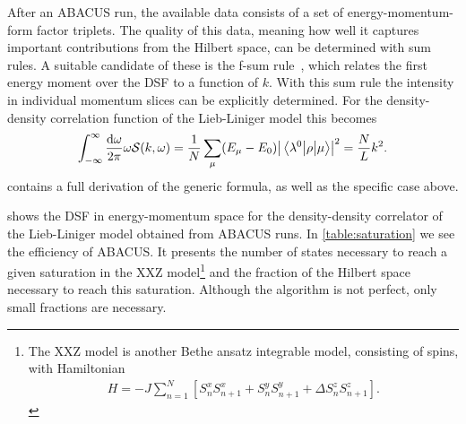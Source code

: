 \documentclass[11pt, a4paper]{report} %
\begin{document}
After an ABACUS run, the available data consists of a set of energy-momentum-form factor triplets.
The quality of this data, meaning how well it captures important contributions from the Hilbert space, can be determined with sum rules.
A suitable candidate of these is the f-sum rule~\cite{Caux2007a}, which relates the first energy moment over the DSF to a function of \(k\).
With this sum rule the intensity in individual momentum slices can be explicitly determined.
For the density-density correlation function of the Lieb-Liniger model this becomes
\begin{align}
  \label{eq:fsumrule}
  \int_{-\infty}^{\infty} \frac{\dd \omega}{2\pi} \omega \mathcal{S}(k, \omega) = \frac{1}{N}\sum_{\mu}(E_{\mu}-E_0)\abs{\mel{\lambda^0}{\rho}{\mu}}^2  = \frac{N}{L} k^2.
\end{align}
 contains a full derivation of the generic formula, as well as the specific case above.

 shows the DSF in energy-momentum space for the density-density correlator of the Lieb-Liniger model obtained from ABACUS runs.
In \cref{table:saturation} we see the efficiency of ABACUS.
It presents the number of states necessary to reach a given saturation in the XXZ model\footnote{The XXZ model is another Bethe ansatz integrable model, consisting of spins, with Hamiltonian~\cite{Franchini2017}
    \begin{align}
      \label{eq:53}
      H = - J \sum_{n=1}^N\left[S_{n}^x S_{n+1}^x+S_n^y S_{n+1}^y + \Delta S_n^z S_{n+1}^z\right].
    \end{align}
} and the fraction of the Hilbert space necessary to reach this saturation.
Although the algorithm is not perfect, only small fractions are necessary.
\end{document}
